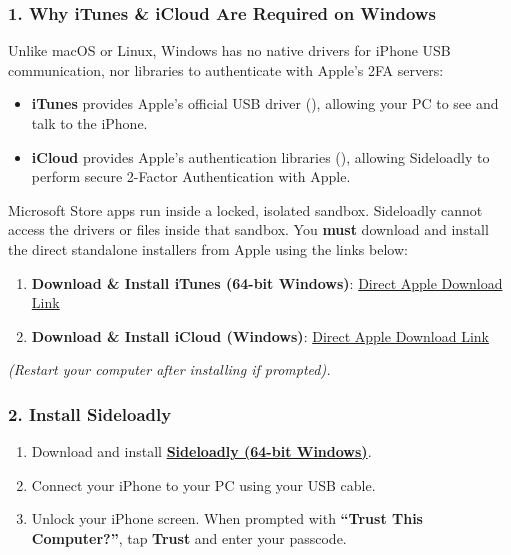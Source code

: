 \documentclass[11pt,a4paper]{article}
\begin{document}
\subsubsection*{1. Why iTunes \& iCloud Are Required on Windows}
Unlike macOS or Linux, Windows has no native drivers for iPhone USB communication, nor libraries to authenticate with Apple's 2FA servers:
\begin{itemize}
    \item \textbf{iTunes} provides Apple's official USB driver (), allowing your PC to see and talk to the iPhone.
    \item \textbf{iCloud} provides Apple's authentication libraries (), allowing Sideloadly to perform secure 2-Factor Authentication with Apple.
\end{itemize}

\begin{importantbox}
Microsoft Store apps run inside a locked, isolated sandbox. Sideloadly cannot access the drivers or files inside that sandbox. You \textbf{must} download and install the direct standalone installers from Apple using the links below:
\end{importantbox}

\begin{enumerate}
    \item \textbf{Download \& Install iTunes (64-bit Windows)}: \href{https://www.apple.com/itunes/download/win64}{Direct Apple Download Link}
    \item \textbf{Download \& Install iCloud (Windows)}: \href{https://updates.cdn-apple.com/2020/windows/001-39935-20200911-1A70AA56-F448-11EA-8109-AE43397F938A/iCloudSetup.exe}{Direct Apple Download Link}
\end{enumerate}
\textit{(Restart your computer after installing if prompted).}

\subsubsection*{2. Install Sideloadly}
\begin{enumerate}
    \item Download and install \href{https://sideloadly.io/}{\textbf{Sideloadly (64-bit Windows)}}.
    \item Connect your iPhone to your PC using your USB cable.
    \item Unlock your iPhone screen. When prompted with \textbf{``Trust This Computer?''}, tap \textbf{Trust} and enter your passcode.
\end{enumerate}
\end{document}
